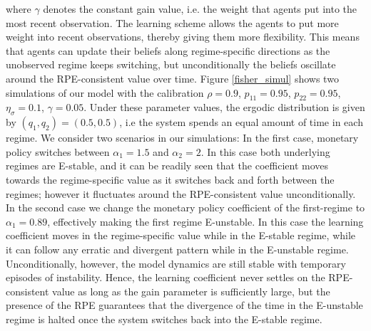 \documentclass[12pt,reqno]{article}
\numberwithin{equation}{section}
\begin{document}
where $\gamma$ denotes the constant gain value, i.e. the weight that agents put into the most recent observation. The learning scheme allows the agents to put more weight into recent observations, thereby giving them more flexibility. This means that agents can update their beliefs along regime-specific directions as the unobserved regime keeps switching, but unconditionally the beliefs oscillate around the RPE-consistent value over time. Figure \ref{fisher_simul} shows two simulations of our model with the calibration $\rho = 0.9$,  $p_{11}=0.95$, $p_{22}= 0.95$, $\eta_{\sigma} = 0.1$, $\gamma=0.05 $. Under these parameter values, the ergodic distribution is given by $(q_1,q_2)=(0.5, 0.5) $, i.e the system spends an equal amount of time in each regime. We consider two scenarios in our simulations: In the first case, monetary policy switches between $\alpha_1=1.5$ and $\alpha_2 = 2 $. In this case both underlying regimes are E-stable, and it can be readily seen that the coefficient moves towards the regime-specific value as it switches back and forth between the regimes; however it fluctuates around the RPE-consistent value unconditionally. In the second case we change the monetary policy coefficient of the first-regime to $\alpha_1=0.89$, effectively making the first regime E-unstable. In this case the learning coefficient moves in the regime-specific value while in the E-stable regime, while it can follow any erratic and divergent pattern while in the E-unstable regime. Unconditionally, however, the model dynamics are still stable with temporary episodes of instability. Hence, the learning coefficient never settles on the RPE-consistent value as long as the gain parameter is sufficiently large, but the presence of the RPE guarantees that the divergence of the time in the E-unstable regime is halted once the system switches back into the E-stable regime.\\


\end{document}
